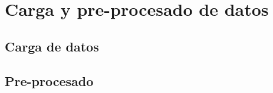 % 

\chapter{Carga y pre-procesado de datos}
\label{limpieza-datos}



\section{Carga de datos}



\section{Pre-procesado}


\pagebreak
\clearpage
